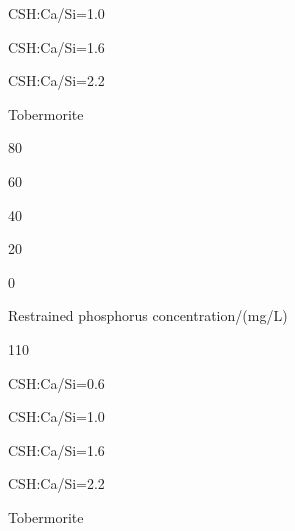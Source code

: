 \documentclass[a4paper,portrait,12pt]{article}
\begin{document}
\begin{flushleft}
CSH:Ca/Si=1.0
\end{flushleft}


\begin{flushleft}
CSH:Ca/Si=1.6
\end{flushleft}


\begin{flushleft}
CSH:Ca/Si=2.2
\end{flushleft}


\begin{flushleft}
Tobermorite
\end{flushleft}





80





60





40





20





0





\begin{flushleft}
Restrained phosphorus concentration/(mg/L)
\end{flushleft}





110


\begin{flushleft}
CSH:Ca/Si=0.6
\end{flushleft}


\begin{flushleft}
CSH:Ca/Si=1.0
\end{flushleft}


\begin{flushleft}
CSH:Ca/Si=1.6
\end{flushleft}


\begin{flushleft}
CSH:Ca/Si=2.2
\end{flushleft}


\begin{flushleft}
Tobermorite
\end{flushleft}
\end{document}
